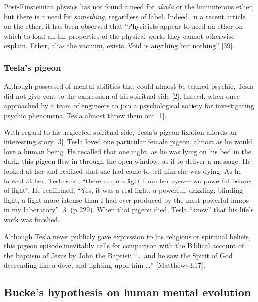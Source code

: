 \documentclass[
  12pt,
  british,
  a4paper,
]{article}
\begin{document}
Post-Einsteinian physics has not found a need for \emph{ākāśa} or the
luminiferous ether, but there is a need for \emph{something}, regardless
of label. Indeed, in a recent article on the ether, it has been observed
that ``Physicists appear to need an ether on which to load all the
properties of the physical world they cannot otherwise explain. Ether,
alias the vacuum, exists. Void is anything but nothing'' {[}39{]}.

\hypertarget{teslas-pigeon}{%
\subsubsection{Tesla's pigeon}\label{teslas-pigeon}}

Although possessed of mental abilities that could almost be termed
psychic, Tesla did not give vent to the expression of his spiritual side
{[}2{]}. Indeed, when once approached by a team of engineers to join a
psychological society for investigating psychic phenomena, Tesla almost
threw them out {[}1{]}.

With regard to his neglected spiritual side, Tesla's pigeon fixation
affords an interesting story {[}3{]}. Tesla loved one particular female
pigeon, almost as he would love a human being. He recalled that one
night, as he was lying on his bed in the dark, this pigeon flew in
through the open window, as if to deliver a message. He looked at her
and realized that she had come to tell him she was dying. As he looked
at her, Tesla said, ``there came a light from her eyes---two powerful
beams of light''. He reaffirmed, ``Yes, it was a real light, a powerful,
dazzling, blinding light, a light more intense than I had ever produced
by the most powerful lamps in my laboratory'' {[}3{]} (p 229). When that
pigeon died, Tesla ``knew'' that his life's work was finished.

Although Tesla never publicly gave expression to his religious or
spiritual beliefs, this pigeon episode inevitably calls for comparison
with the Biblical account of the baptism of Jesus by John the Baptist:
``\ldots{} and he saw the Spirit of God descending like a dove, and
lighting upon him \ldots{}'' {[}Matthew\textasciitilde3:17{]}.

\hypertarget{buckes-hypothesis-on-human-mental-evolution}{%
\subsection{Bucke's hypothesis on human mental
evolution}\label{buckes-hypothesis-on-human-mental-evolution}}
\end{document}
